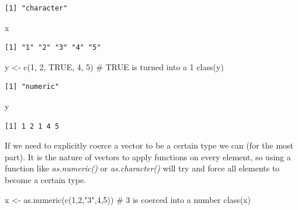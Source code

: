 \documentclass[
  letterpaper,
  DIV=11,
  numbers=noendperiod]{scrreprt}
\newenvironment{Shaded}{\begin{snugshade}}{\end{snugshade}}
\newcommand{\CommentTok}[1]{\textcolor[rgb]{0.37,0.37,0.37}{#1}}
\newcommand{\ConstantTok}[1]{\textcolor[rgb]{0.56,0.35,0.01}{#1}}
\newcommand{\DecValTok}[1]{\textcolor[rgb]{0.68,0.00,0.00}{#1}}
\newcommand{\FunctionTok}[1]{\textcolor[rgb]{0.28,0.35,0.67}{#1}}
\newcommand{\NormalTok}[1]{\textcolor[rgb]{0.00,0.23,0.31}{#1}}
\newcommand{\OtherTok}[1]{\textcolor[rgb]{0.00,0.23,0.31}{#1}}
\newcommand{\StringTok}[1]{\textcolor[rgb]{0.13,0.47,0.30}{#1}}
\begin{document}
\begin{verbatim}
[1] "character"
\end{verbatim}

\begin{Shaded}
\begin{Highlighting}[]
\NormalTok{x}
\end{Highlighting}
\end{Shaded}

\begin{verbatim}
[1] "1" "2" "3" "4" "5"
\end{verbatim}

\begin{Shaded}
\begin{Highlighting}[]
\NormalTok{y }\OtherTok{\textless{}{-}} \FunctionTok{c}\NormalTok{(}\DecValTok{1}\NormalTok{, }\DecValTok{2}\NormalTok{, }\ConstantTok{TRUE}\NormalTok{, }\DecValTok{4}\NormalTok{, }\DecValTok{5}\NormalTok{) }\CommentTok{\# TRUE is turned into a 1}
\FunctionTok{class}\NormalTok{(y)}
\end{Highlighting}
\end{Shaded}

\begin{verbatim}
[1] "numeric"
\end{verbatim}

\begin{Shaded}
\begin{Highlighting}[]
\NormalTok{y}
\end{Highlighting}
\end{Shaded}

\begin{verbatim}
[1] 1 2 1 4 5
\end{verbatim}

If we need to explicitly coerce a vector to be a certain type we can
(for the most part). It is the nature of vectors to apply functions on
every element, so using a function like \emph{as.numeric()} or
\emph{as.character()} will try and force all elements to become a
certain type.

\begin{Shaded}
\begin{Highlighting}[]
\NormalTok{x }\OtherTok{\textless{}{-}} \FunctionTok{as.numeric}\NormalTok{(}\FunctionTok{c}\NormalTok{(}\DecValTok{1}\NormalTok{,}\DecValTok{2}\NormalTok{,}\StringTok{"3"}\NormalTok{,}\DecValTok{4}\NormalTok{,}\DecValTok{5}\NormalTok{)) }\CommentTok{\# 3 is coerced into a number}
\FunctionTok{class}\NormalTok{(x)}
\end{Highlighting}
\end{Shaded}
\end{document}
